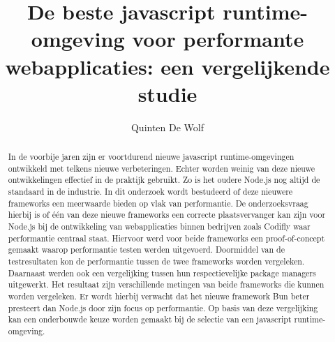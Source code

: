 \documentclass{hogent-article}
\title{De beste javascript runtime-omgeving voor performante webapplicaties: een vergelijkende studie}
\author{Quinten De Wolf}
\begin{document}
\begin{abstract}
  In de voorbije jaren zijn er voortdurend nieuwe javascript runtime-omgevingen ontwikkeld met telkens nieuwe verbeteringen. 
  Echter worden weinig van deze nieuwe ontwikkelingen effectief in de praktijk gebruikt.
  Zo is het oudere Node.js nog altijd de standaard in de industrie. 
  In dit onderzoek wordt bestudeerd of deze nieuwere frameworks een meerwaarde bieden op vlak van performantie.
  De onderzoeksvraag hierbij is of één van deze nieuwe frameworks  
  een correcte plaatsvervanger kan zijn voor Node.js bij de ontwikkeling van webapplicaties binnen bedrijven 
  zoals Codifly waar performantie centraal staat.
  Hiervoor werd voor beide frameworks een proof-of-concept gemaakt waarop performantie testen werden uitgevoerd.
  Doormiddel van de testresultaten kon de performantie tussen de twee frameworks worden vergeleken.
  Daarnaast werden ook een vergelijking tussen hun respectievelijke package managers uitgewerkt. 
  Het resultaat zijn verschillende metingen van beide frameworks die kunnen worden vergeleken.
  Er wordt hierbij verwacht dat het nieuwe framework Bun beter presteert dan Node.js door zijn focus op performantie.
  Op basis van deze vergelijking kan een onderbouwde keuze worden gemaakt bij de selectie van een javascript runtime-omgeving.

\end{abstract}

\tableofcontents



\printbibliography[heading=bibintoc]
\end{document}
